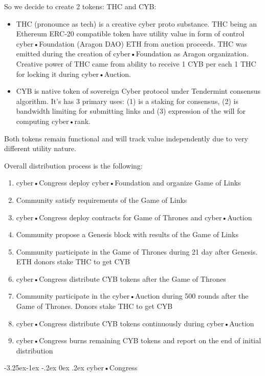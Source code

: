 \documentclass[8pt,oneside]{amsart}
\makeatletter
\renewcommand\subsection{\@startsection{subsection}{2}{\z@}%
                                     {-3.25ex\@plus -1ex \@minus -.2ex}%
                                     {0ex \@plus .2ex}%
                                     {\play\Large}}%
\newcommand{\titleSection}[1]{\subsection{#1}}
\makeatother
\begin{document}
So we decide to create 2 tokens: THC and CYB:

\begin{itemize}
\item THC (pronounce as tech) is a creative cyber proto substance. THC being an Ethereum ERC-20 compatible token have utility value in form of control cyber•Foundation (Aragon DAO) ETH from auction proceeds. THC was emitted during the creation of cyber•Foundation as Aragon organization. Creative power of THC came from ability to receive 1 CYB per each 1 THC for locking it during cyber•Auction.
\item CYB is native token of sovereign Cyber protocol under Tendermint consensus algorithm. It's has 3 primary uses: (1) is a staking for consensus, (2) is bandwidth limiting for submitting links and (3) expression of the will for computing cyber•rank.
\end{itemize}

Both tokens remain functional and will track value independently due to very different utility nature.

Overall distribution process is the following:

\begin{enumerate}
 \item cyber•Congress deploy cyber•Foundation and organize Game of Links
 \item Community satisfy requirements of the Game of Links
 \item cyber•Congress deploy contracts for Game of Thrones and cyber•Auction
 \item Community propose a Genesis block with results of the Game of Links
 \item Community participate in the Game of Thrones during 21 day after Genesis. ETH donors stake THC to get CYB
 \item cyber•Congress distribute CYB tokens after the Game of Thrones
 \item Community participate in the cyber•Auction during 500 rounds after the Game of Thrones. Donors stake THC to get CYB
 \item cyber•Congress distribute CYB tokens continuously during cyber•Auction
 \item cyber•Congress burns remaining CYB tokens and report on the end of initial distribution
\end{enumerate}

\titleSection{cyber•Congress}\label{cybercongress}
\end{document}
